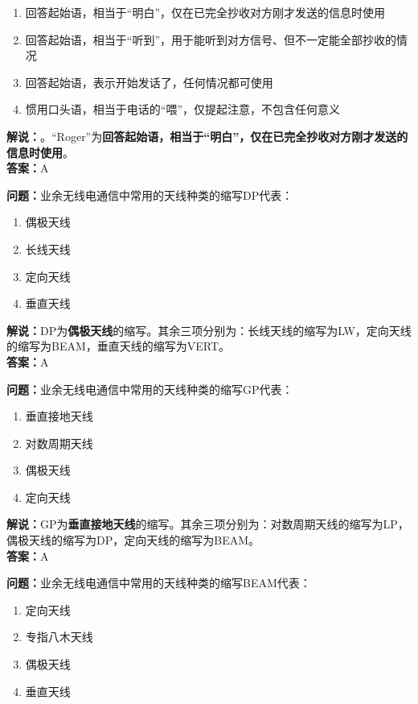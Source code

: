 \begin{enumerate}[label=\Alph*), leftmargin=1cm]
	\item 回答起始语，相当于“明白”，仅在已完全抄收对方刚才发送的信息时使用
	\item 回答起始语，相当于“听到”，用于能听到对方信号、但不一定能全部抄收的情况
	\item 回答起始语，表示开始发话了，任何情况都可使用
	\item 惯用口头语，相当于电话的“喂”，仅提起注意，不包含任何意义
\end{enumerate}

\textbf{解说：}。“Roger”为\textbf{回答起始语，相当于“明白”，仅在已完全抄收对方刚才发送的信息时使用}。\\\textbf{答案：}A



\textbf{问题：}业余无线电通信中常用的天线种类的缩写DP代表：

\begin{enumerate}[label=\Alph*), leftmargin=1cm]
	\item 偶极天线
	\item 长线天线
	\item 定向天线
	\item 垂直天线
\end{enumerate}

\textbf{解说：}DP为\textbf{偶极天线}的缩写。其余三项分别为：长线天线的缩写为LW，定向天线的缩写为BEAM，垂直天线的缩写为VERT。\\\textbf{答案：}A



\textbf{问题：}业余无线电通信中常用的天线种类的缩写GP代表：

\begin{enumerate}[label=\Alph*), leftmargin=1cm]
	\item 垂直接地天线
	\item 对数周期天线
	\item 偶极天线
	\item 定向天线
\end{enumerate}

\textbf{解说：}GP为\textbf{垂直接地天线}的缩写。其余三项分别为：对数周期天线的缩写为LP，偶极天线的缩写为DP，定向天线的缩写为BEAM。\\\textbf{答案：}A



\textbf{问题：}业余无线电通信中常用的天线种类的缩写BEAM代表：

\begin{enumerate}[label=\Alph*), leftmargin=1cm]
	\item 定向天线
	\item 专指八木天线
	\item 偶极天线
	\item 垂直天线
\end{enumerate}


